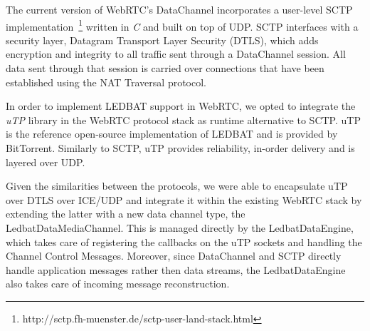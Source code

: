 \documentclass{sig-alternate}
\begin{document}
The current version of WebRTC's DataChannel incorporates a user-level SCTP
implementation~\footnote{http://sctp.fh-muenster.de/sctp-user-land-stack.html} written in
\textit{C} and built on top of UDP. SCTP interfaces with a security layer, Datagram
Transport Layer Security (DTLS), which adds encryption and integrity to all traffic sent
through a DataChannel session. All data sent through that session is carried over
connections that have been established using the NAT Traversal protocol.



In order to implement LEDBAT support in WebRTC, we opted to integrate the \textit{uTP} library 
\cite{utp-repo} in the WebRTC protocol stack as runtime alternative to SCTP. uTP is the reference
open-source implementation of LEDBAT and is provided by BitTorrent. Similarly to SCTP, uTP 
provides reliability, in-order delivery and is layered over UDP.

Given the similarities between the protocols, we were able to encapsulate uTP over DTLS over ICE/UDP and integrate it within the existing WebRTC stack by extending the latter with a new data channel type, the LedbatDataMediaChannel. This is managed directly by the LedbatDataEngine, which takes care of registering the callbacks on the uTP sockets and handling the Channel Control Messages. Moreover, since DataChannel and SCTP directly handle application messages rather then data streams, the LedbatDataEngine also takes care of incoming message reconstruction.

\label{sec:architecture}
\end{document}
